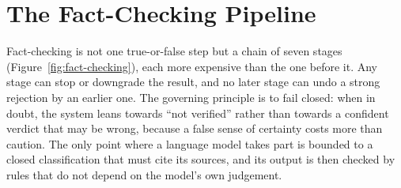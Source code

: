 
\section{The Fact-Checking Pipeline}
\label{sec:design-fact-checking}

Fact-checking is not one true-or-false step but a chain of seven stages
(Figure~\ref{fig:fact-checking}), each more expensive than the one
before it. Any stage can stop or downgrade the result, and no later
stage can undo a strong rejection by an earlier one. The governing
principle is to fail closed: when in doubt, the system leans towards
``not verified'' rather than towards a confident verdict that may be
wrong, because a false sense of certainty costs more than caution. The
only point where a language model takes part is bounded to a closed
classification that must cite its sources, and its output is then
checked by rules that do not depend on the model's own judgement.

